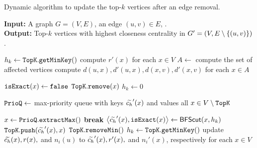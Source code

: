 \begin{algorithm}[tb]
\small
{}
\caption{\footnotesize Dynamic \nbcut algorithm to update the
top-$k$ vertices after an edge removal.}
\label{algo:nbcut-dyn-rem}
\textbf{Input:} A graph $G = (V, E)$, an edge $(u,v) \in E$, \topk.\\
\textbf{Output:} Top-$k$ vertices with highest closeness centrality in
$G' = (V, E \setminus \set{(u, v)})$.

\begin{algorithmic}[1]
\State$h_k \gets \texttt{TopK}.\texttt{getMinKey}()$
\State compute $r'(x)$ for each $x \in V$\label{line:nbcut-dyn-rem-reach}
\State$A \gets $ compute the set of affected vertices
\State compute $d(u, x), d'(u, x), d(x, v), d'(x, v)$ for each $x\in A$
\smallskip

\State$\texttt{isExact}(x) \gets \texttt{false}$\label{line:nbcut-dyn-rem-aff1}
\State$\texttt{TopK}.\texttt{remove}(x)$\label{line:nbcut-dyn-rem-aff2}
\State$h_k \gets 0$\label{line:nbcut-dyn-rem-hk}
\EndIf
\EndFor

\State$\texttt{PrioQ} \gets$ max-priority queue with keys $\widetilde{c_h}'(x)$ and values all
$x\in V \setminus \texttt{TopK}$\label{line:nbcut-dyn-rem-pq}\smallskip

\State$x \gets \texttt{PrioQ}.\texttt{extractMax}()$
\State\textbf{break}\label{line:nbcut-dyn-rem-early-stop}
\EndIf
{}
\State$\left< \harmupp'(x), \isexact(x) \right> \gets \bfscut(x, h_k)$
\label{line:nbcut-dyn-rem-bfscut}
\EndIf
{}
\State$\texttt{TopK}.\texttt{push}(\widetilde{c_h}'(x), x)$
\EndIf
{}
\State$\texttt{TopK}.\texttt{removeMin}()$
\EndIf
{}
\State$h_k \gets \texttt{TopK}.\texttt{getMinKey}()$
\EndIf
\EndWhile
\State update $\widetilde{c_h}(x), r(x),$ and $n_i(u)$ to $\widetilde{c_h}'(x), r'(x),$ and $n_i'(x)$, respectively
for each $x\in V$
\State\Return\topk\label{line:nbcut-dyn-rem-end}
\end{algorithmic}
\end{algorithm}
